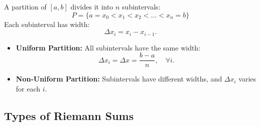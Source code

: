 \documentclass[a4paper,11pt]{article}
\theoremstyle{definition}
\theoremstyle{plain}
\theoremstyle{remark}
\begin{document}
\begin{tcolorbox}[breakable]
    A partition of $[a, b]$ divides it into $n$ subintervals:
    \[
    P = \{ a = x_0 < x_1 < x_2 < \dots < x_n = b \}
    \]
    Each subinterval has width:
    \[
    \Delta x_i = x_i - x_{i-1}.
    \]
    \begin{itemize}
        \item \textbf{Uniform Partition:} All subintervals have the same width:
        \[
        \Delta x_i = \Delta x = \frac{b-a}{n}, \quad \forall i.
        \]
        \item \textbf{Non-Uniform Partition:}  Subintervals have different widths, and \( \Delta x_i \) varies for each \( i \).
    \end{itemize}
\end{tcolorbox}



\subsection{Types of Riemann Sums}
\end{document}
